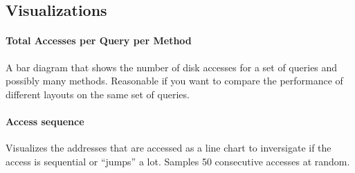     
 \subsection{Visualizations}
    \paragraph{Total Accesses per Query per Method}
    A bar diagram that shows the number of disk accesses for a set of queries and possibly many methods. Reasonable if you want to compare the performance of different layouts on the same set of queries.
    
    \paragraph{Access sequence} Visualizes the addresses that are accessed as a line chart to inversigate if the access is sequential or ``jumps'' a lot. Samples 50 consecutive accesses at random.
